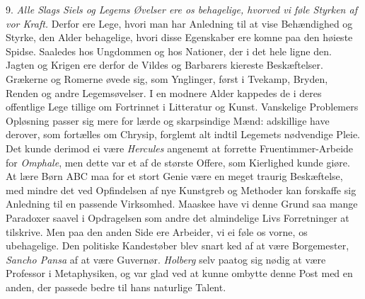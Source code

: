 \documentclass[12pt,a4paper]{article}
\newcommand{\opage}[1]{\marginnote{\footnotesize\textit{[#1]}}}
\begin{document}
9. \emph{Alle Slags Siels og Legems Øvelser ere os behagelige, hvorved vi føle Styrken af
vor Kraft.} Derfor ere Lege, hvori man har Anledning til at vise Behændighed og Styrke, den
Alder behagelige, hvori disse Egenskaber ere komne paa den høieste Spidse. Saaledes hos
Ungdommen og hos Nationer, der i det hele ligne den. Jagten og Krigen ere derfor de Vildes
og Barbarers kiereste Beskæftelser. Grækerne og Romerne øvede sig, som Ynglinger, først i
Tvekamp, Bryden, Renden og andre
\opage{205} Legemsøvelser. I en modnere Alder kappedes de i deres offentlige Lege tillige om
Fortrinnet i Litteratur og Kunst. Vanskelige Problemers Opløsning passer sig mere for lærde
og skarpsindige Mænd: adskillige have derover, som fortælles om Chrysip, forglemt alt
indtil Legemets nødvendige Pleie. Det kunde derimod ei være \emph{Hercules} angenemt at
forrette Fruentimmer-Arbeide for \emph{Omphale}, men dette var et af de største Offere, som
Kierlighed kunde giøre. At lære Børn ABC maa for et stort Genie være en meget traurig
Beskæftelse, med mindre det ved Opfindelsen af nye Kunstgreb og Methoder kan forskaffe sig
Anledning til en passende Virksomhed. Maaskee have vi denne Grund saa mange Paradoxer
saavel i Opdragelsen som andre det almindelige Livs Forretninger at tilskrive. Men paa den
anden Side ere Arbeider, vi ei føle os vorne, os ubehagelige. Den politiske Kandestøber
blev snart ked af at være Borgemester, \emph{Sancho Pansa} af at være Guvernør.
\emph{Holberg} selv paatog sig nødig at være Professor i Metaphysiken, og var glad ved at
kunne ombytte denne Post med en anden, der passede bedre til hans naturlige Talent.
\end{document}
